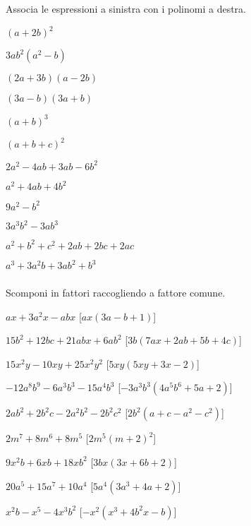 \begin{esercizio}
\label{ese:div.008}
Associa le espressioni a sinistra con i polinomi a destra.
  \begin{multicols}{2}
\begin{enumeratea}
\item $(a+2b)^{2}$
\item $3ab^{2}(a^{2}-b)$
\item $(2a+3b)(a-2b)$
\item $(3a-b)(3a+b)$
\item $(a+b)^{3}$
\item $(a+b+c)^{2}$
\item $2a^{2}-4ab+3ab-6b^{2}$
\item $a^{2}+4ab+4b^{2}$
\item $9a^{2}-b^{2}$
\item $3a^{3}b^{2}-3ab^{3}$
\item $a^{2}+b^{2}+c^{2}+2ab+2bc+2ac$
\item $a^{3}+3a^{2}b+3ab^{2}+b^{3}$
\end{enumeratea}
  \end{multicols}
\end{esercizio}

\subsubsection*{}

\begin{esercizio}[\Ast]
\label{ese:div.009}
Scomponi in fattori raccogliendo a fattore comune.
\begin{enumeratea}
 \item $ax+3a^{2}x-abx$ \hfill [$ax(3a-b+1)$]
 \item $15b^{2}+12bc+21abx+6ab^{2}$ \hfill [$3b(7ax+2ab+5b+4c)$]
 \item $15x^{2}y-10xy+25x^{2}y^{2}$ \hfill [$5xy(5xy+3x-2)$]
 \item $-12a^{8}b^{9}-6a^{3}b^{3}-15a^{4}b^{3}$ 
  \hfill [$-3a^{3}b^{3}\left(4a^{5}b^{6}+5a+2\right)$]
 \item $2ab^{2}+2b^{2}c-2a^{2}b^{2}-2b^{2}c^{2}$ 
  \hfill [$2b^{2}(a+c-a^{2}-c^{2})$]
 \item $2m^{7}+8m^{6}+8m^{5}$ 
  \hfill [$2m^{5}\left(m+2\right)^{2}$]
 \item $9x^{2}b+6xb+18xb^{2}$ \hfill [$3bx(3x+6b+2)$]
 \item $20a^{5}+15a^{7}+10a^{4}$ \hfill [$5a^{4}\left(3a^{3}+4a+2\right)$]
 \item $x^{2}b-x^{5}-4x^{3}b^{2}$ \hfill [$-x^{2}\left(x^{3}+4b^{2}x-b\right)$]
\end{enumeratea}
\end{esercizio}

